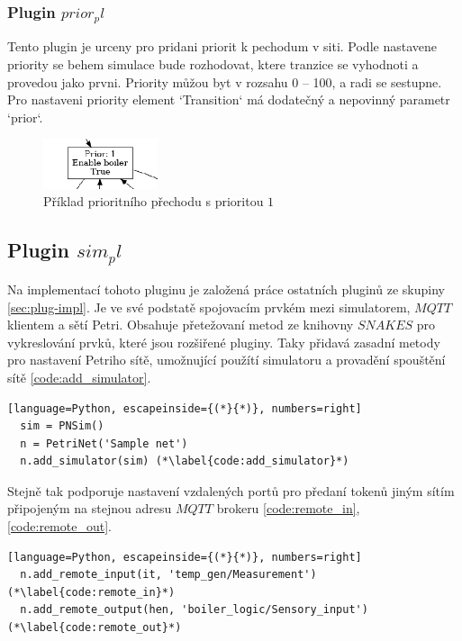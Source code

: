 \subsubsection{Plugin $prior_pl$}
\label{subsec:prior_pl}
Tento plugin je urceny pro pridani priorit k pechodum v siti. Podle nastavene priority se behem simulace bude rozhodovat, ktere tranzice se vyhodnoti a provedou jako prvni. Priority můžou byt v rozsahu 0 -- 100, a radi se sestupne. Pro nastaveni priority element `Transition` má dodatečný a nepovinný parametr `prior`. 
\begin{figure}[hbt]
  \centering
  \includegraphics[width=0.3\textwidth]{obrazky-figures/prior-transition.png}
  \caption{Příklad prioritního přechodu s prioritou $1$}
  \label{timed-transition}
\end{figure}

\subsection{Plugin $sim_pl$}
\label{sec:aplikace-mqtt}
Na implementací tohoto pluginu je založená práce ostatních pluginů ze skupiny \ref{sec:plug-impl}. Je ve své podstatě spojovacím prvkém mezi simulatorem, $MQTT$ klientem a sětí Petri. Obsahuje přetežovaní metod ze knihovny $SNAKES$ pro vykreslování prvků, které jsou rozšiřené pluginy. Taky přidavá zasadní metody pro nastavení Petriho sítě, umožnující použítí simulatoru a provadění spouštění sítě \ref{code:add_simulator}.
\begin{lstlisting}[language=Python, escapeinside={(*}{*)}, numbers=right]
  sim = PNSim()
  n = PetriNet('Sample net')
  n.add_simulator(sim) (*\label{code:add_simulator}*)
\end{lstlisting}

Stejně tak podporuje nastavení vzdalených portů pro předaní tokenů jiným sítím připojeným na stejnou adresu $MQTT$ brokeru \ref{code:remote_in}, \ref{code:remote_out}.
\begin{lstlisting}[language=Python, escapeinside={(*}{*)}, numbers=right]
  n.add_remote_input(it, 'temp_gen/Measurement') (*\label{code:remote_in}*)
  n.add_remote_output(hen, 'boiler_logic/Sensory_input') (*\label{code:remote_out}*)
\end{lstlisting}


